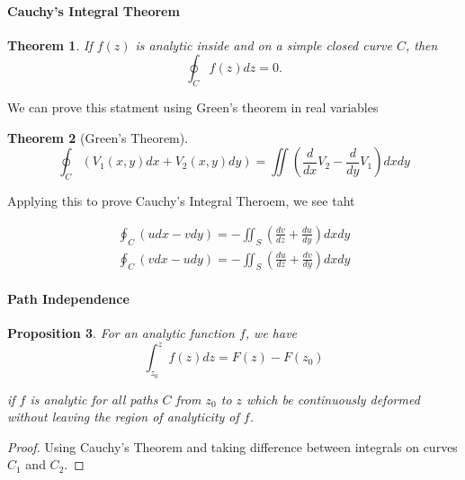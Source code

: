 \documentclass[12pt]{article}
\newcommand{\diff}[2]{\frac{d #1}{d #2}}
\newtheorem{thm}{Theorem}[section]
\newtheorem{prop}[thm]{Proposition}
\theoremstyle{definition}
\theoremstyle{remark}
\numberwithin{equation}{section}
\begin{document}
\paragraph{Cauchy's Integral Theorem}%
\label{par:cauchy_s_integral_theorem}

\begin{thm}
  If $f(z)$ is analytic inside and on a simple closed curve $C$, then 
  \begin{equation}
    \oint_C f(z) dz = 0.
  \end{equation}
\end{thm}

We can prove this statment using Green's theorem in real variables

\begin{thm}[Green's Theorem]
\begin{equation}
  \oint_C (V_1(x,y)dx + V_2(x,y)dy) = \iint (\diff{}{x}V_2 - \diff{}{y}V_1)dxdy
\end{equation}
\end{thm}



Applying this to prove Cauchy's Integral Theroem, we see taht 

\begin{align}
  \oint_C (u dx - vdy) = - \iint_S (\diff{v}{z} + \diff{u}{y})dxdy \\
  \oint_C (v dx - udy) = - \iint_S (\diff{u}{z} + \diff{v}{y})dxdy 
\end{align}

\paragraph{Path Independence}%
\label{par:path_independence}

\begin{prop}
For an analytic function $f$, we have
\begin{equation}
  \int_{z_0}^{z} f(z) dz = F(z) - F(z_0)
\end{equation}

if $f$ is analytic for all paths $C$ from $z_0$ to $z$ which be continuously deformed without leaving the region of analyticity of $f$. 
\end{prop}
\begin{proof}
  Using Cauchy's Theorem and taking difference between integrals on curves $C_1$ and $C_2$.
\end{proof}

\end{document}
